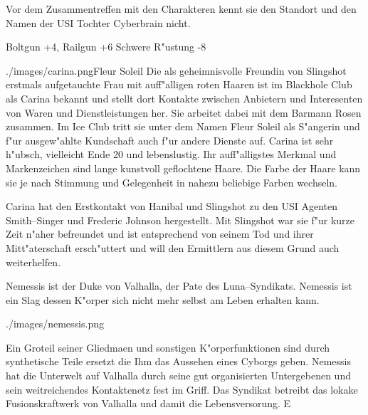 Vor dem Zusammentreffen mit den Charakteren kennt sie den Standort und den Namen der USI Tochter Cyberbrain nicht.

\begin{nscsheet}[f]{\xls}
    \nscstats[ATT=9,AGG=10,EMP=4,KNO=4,HP=14]
    \nscruler
    \begin{nscinventory}
        \nscitem[Waffen] Boltgun +4, Railgun +6
        \nscitem[R"ustung] Schwere R"ustung -8
    \end{nscinventory}
\end{nscsheet}



\begin{sideimagebox}[r]{0.6}{./images/carina.png}{Fleur Soleil}
    Die als geheimnisvolle Freundin von Slingshot erstmals aufgetauchte Frau mit auff"alligen roten Haaren ist im Blackhole Club als Carina bekannt und stellt dort Kontakte zwischen Anbietern und Interesenten von Waren und Dienstleistungen her. Sie arbeitet dabei mit dem Barmann Rosen zusammen. Im Ice Club tritt sie unter dem Namen Fleur Soleil als S"angerin und f"ur ausgew"ahlte Kundschaft auch f"ur andere Dienste auf. Carina ist sehr h"ubsch, vielleicht Ende 20 und lebenslustig. Ihr auff"alligstes Merkmal und Markenzeichen sind lange kunstvoll geflochtene Haare. Die Farbe der Haare kann sie je nach Stimmung und Gelegenheit in nahezu beliebige Farben wechseln.

    Carina hat den Erstkontakt von Hanibal und Slingshot zu den USI Agenten Smith--Singer und Frederic Johnson hergestellt. Mit Slingshot war sie f"ur kurze Zeit n"aher befreundet und ist entsprechend von seinem Tod und ihrer Mitt"aterschaft ersch"uttert und will den Ermittlern aus diesem Grund auch weiterhelfen.
\end{sideimagebox}
\vfill\pagebreak


Nemessis ist der Duke von Valhalla, der Pate des Luna--Syndikats. Nemessis ist ein Slag dessen K"orper sich nicht mehr selbst am Leben erhalten kann. 

\begin{sideimagebox}[r]{0.9}{./images/nemessis.png}{}

\end{sideimagebox}

Ein Gro\3teil seiner Gliedma\3en und sonstigen K"orperfunktionen sind durch synthetische Teile ersetzt die Ihm das Aussehen eines Cyborgs geben. Nemessis hat die Unterwelt auf Valhalla durch seine gut organisierten Untergebenen und sein weitreichendes Kontaktenetz
fest im Griff. Das Syndikat betreibt das lokake Fusionskraftwerk von Valhalla und damit die Lebensversorung. E

